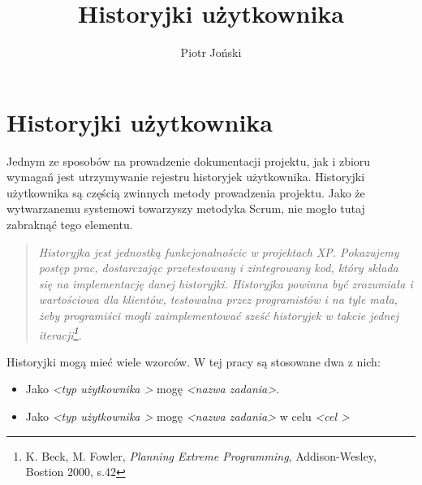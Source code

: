 \documentclass[a4paper,11pt]{article}
\author{Piotr Joński}
\title{Historyjki użytkownika}
\newenvironment{italicquote}
{\begin{quote}\itshape}
{\end{quote}}
\begin{document}
\maketitle
\tableofcontents
\newpage

\section{Historyjki użytkownika}
Jednym ze sposobów na prowadzenie dokumentacji projektu, jak i zbioru wymagań jest utrzymywanie rejestru historyjek użytkownika. Historyjki użytkownika są częścią zwinnych metody prowadzenia projektu. Jako że wytwarzanemu systemowi towarzyszy metodyka Scrum, nie mogło tutaj zabraknąć tego elementu.

\begin{italicquote}
	Historyjka jest jednostką funkcjonalnościc w projektach XP. Pokazujemy postęp prac, dostarczając przetestowany i zintegrowany kod, który składa się na implementację danej historyjki. Historyjka powinna być zrozumiała i wartościowa dla klientów, testowalna przez programistów i na tyle mała, żeby programiści mogli zaimplementować sześć historyjek w takcie jednej iteracji\footnote{K. Beck, M. Fowler, \textit{Planning Extreme Programming}, Addison-Wesley, Bostion 2000, s.42}.
\end{italicquote}

Historyjki mogą mieć wiele wzorców. W tej pracy są stosowane dwa z nich:
\begin{itemize}
	\item Jako \textit{\textless typ użytkownika \textgreater} mogę \textit{\textless nazwa zadania\textgreater}.
	\item Jako \textit{\textless typ użytkownika \textgreater} mogę \textit{\textless nazwa zadania\textgreater} w celu \textit{\textless cel \textgreater}\cite{SCRUM}
\end{itemize} 
\end{document}
